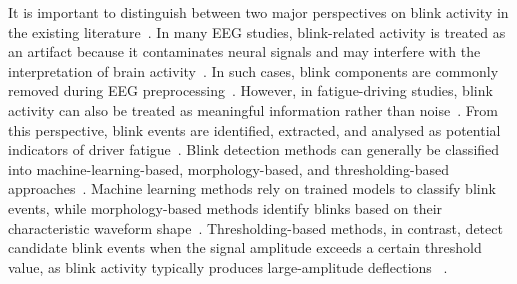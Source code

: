 It is important to distinguish between two major perspectives on blink activity in the existing literature~\citep{croft2000removal,tian2021fatigue}.
In many EEG studies, blink-related activity is treated as an artifact because it contaminates neural signals and may interfere with the interpretation of brain activity~\citep{croft2000removal,akuthota2023artifacts}. In such cases, blink components are commonly removed during EEG preprocessing~\citep{croft2000removal,klein2013reliable}. However, in fatigue-driving studies, blink activity can also be treated as meaningful information rather than noise~\citep{tian2021fatigue,shahbakhti2023fusion}. From this perspective, blink events are identified, extracted, and analysed as potential indicators of driver fatigue~\citep{ko2020eyeblink,shahbakhti2023fusion}. Blink detection methods can generally be classified into machine-learning-based, morphology-based, and thresholding-based approaches~\citep{agarwal2019blink,zhang2023method}. Machine learning methods rely on trained models to classify blink events, while morphology-based methods identify blinks based on their characteristic waveform shape~\citep{rashida2023quantitative,jiang2023eyeblink}. Thresholding-based methods, in contrast, detect
candidate blink events when the signal amplitude exceeds a certain threshold value, as blink activity typically produces large-amplitude deflections ~\citep{chang2016detection,kleifges2017blinker}.


